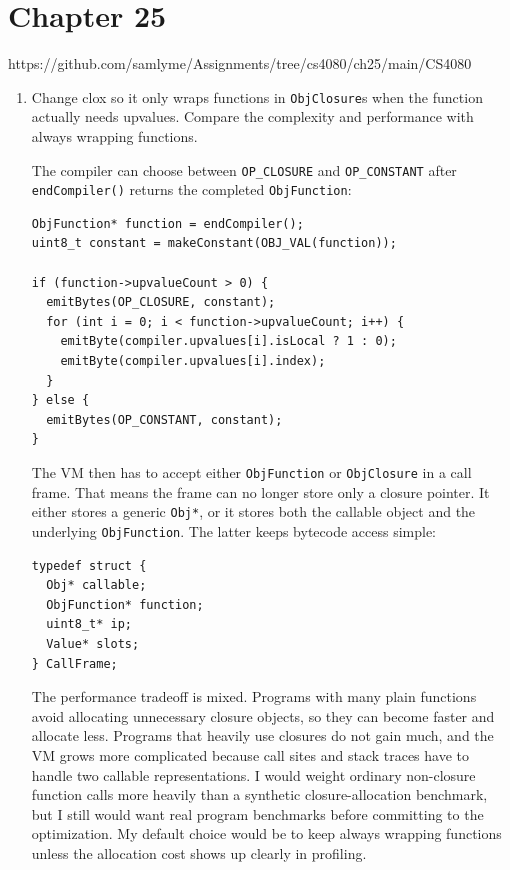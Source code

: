 \documentclass{article}
\begin{document}
\section*{Chapter 25}
https://github.com/samlyme/Assignments/tree/cs4080/ch25/main/CS4080
\begin{enumerate}
    \item {
        Change clox so it only wraps functions in \texttt{ObjClosure}s when the function
        actually needs upvalues. Compare the complexity and performance with always
        wrapping functions.

        The compiler can choose between \texttt{OP\_CLOSURE} and \texttt{OP\_CONSTANT}
        after \texttt{endCompiler()} returns the completed \texttt{ObjFunction}:

        \begin{verbatim}
ObjFunction* function = endCompiler();
uint8_t constant = makeConstant(OBJ_VAL(function));

if (function->upvalueCount > 0) {
  emitBytes(OP_CLOSURE, constant);
  for (int i = 0; i < function->upvalueCount; i++) {
    emitByte(compiler.upvalues[i].isLocal ? 1 : 0);
    emitByte(compiler.upvalues[i].index);
  }
} else {
  emitBytes(OP_CONSTANT, constant);
}
        \end{verbatim}

        The VM then has to accept either \texttt{ObjFunction} or \texttt{ObjClosure} in a
        call frame. That means the frame can no longer store only a closure pointer.
        It either stores a generic \texttt{Obj*}, or it stores both the callable object
        and the underlying \texttt{ObjFunction}. The latter keeps bytecode access simple:

        \begin{verbatim}
typedef struct {
  Obj* callable;
  ObjFunction* function;
  uint8_t* ip;
  Value* slots;
} CallFrame;
        \end{verbatim}

        The performance tradeoff is mixed. Programs with many plain functions avoid
        allocating unnecessary closure objects, so they can become faster and allocate
        less. Programs that heavily use closures do not gain much, and the VM grows
        more complicated because call sites and stack traces have to handle two
        callable representations. I would weight ordinary non-closure function calls
        more heavily than a synthetic closure-allocation benchmark, but I still would
        want real program benchmarks before committing to the optimization. My default
        choice would be to keep always wrapping functions unless the allocation cost
        shows up clearly in profiling.
    }


\end{enumerate}
\end{document}
